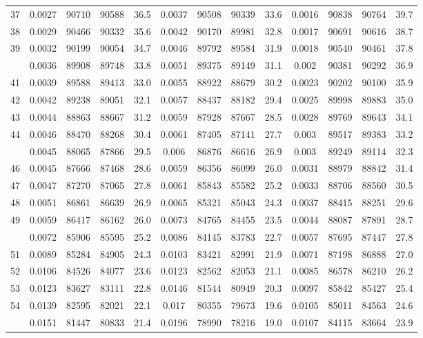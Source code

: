 \documentclass[
  14pt,
]{article}
\begin{document}
\begin{longtable}[t]{lcccccccccccc}
37 & 0.0027 & 90710 & 90588 & 36.5 & 0.0037 & 90508 & 90339 & 33.6 & 0.0016 & 90838 & 90764 & 39.7\\
38 & 0.0029 & 90466 & 90332 & 35.6 & 0.0042 & 90170 & 89981 & 32.8 & 0.0017 & 90691 & 90616 & 38.7\\
39 & 0.0032 & 90199 & 90054 & 34.7 & 0.0046 & 89792 & 89584 & 31.9 & 0.0018 & 90540 & 90461 & 37.8\\
\addlinespace
40 & 0.0036 & 89908 & 89748 & 33.8 & 0.0051 & 89375 & 89149 & 31.1 & 0.002 & 90381 & 90292 & 36.9\\
41 & 0.0039 & 89588 & 89413 & 33.0 & 0.0055 & 88922 & 88679 & 30.2 & 0.0023 & 90202 & 90100 & 35.9\\
42 & 0.0042 & 89238 & 89051 & 32.1 & 0.0057 & 88437 & 88182 & 29.4 & 0.0025 & 89998 & 89883 & 35.0\\
43 & 0.0044 & 88863 & 88667 & 31.2 & 0.0059 & 87928 & 87667 & 28.5 & 0.0028 & 89769 & 89643 & 34.1\\
44 & 0.0046 & 88470 & 88268 & 30.4 & 0.0061 & 87405 & 87141 & 27.7 & 0.003 & 89517 & 89383 & 33.2\\
\addlinespace
45 & 0.0045 & 88065 & 87866 & 29.5 & 0.006 & 86876 & 86616 & 26.9 & 0.003 & 89249 & 89114 & 32.3\\
46 & 0.0045 & 87666 & 87468 & 28.6 & 0.0059 & 86356 & 86099 & 26.0 & 0.0031 & 88979 & 88842 & 31.4\\
47 & 0.0047 & 87270 & 87065 & 27.8 & 0.0061 & 85843 & 85582 & 25.2 & 0.0033 & 88706 & 88560 & 30.5\\
48 & 0.0051 & 86861 & 86639 & 26.9 & 0.0065 & 85321 & 85043 & 24.3 & 0.0037 & 88415 & 88251 & 29.6\\
49 & 0.0059 & 86417 & 86162 & 26.0 & 0.0073 & 84765 & 84455 & 23.5 & 0.0044 & 88087 & 87891 & 28.7\\
\addlinespace
50 & 0.0072 & 85906 & 85595 & 25.2 & 0.0086 & 84145 & 83783 & 22.7 & 0.0057 & 87695 & 87447 & 27.8\\
51 & 0.0089 & 85284 & 84905 & 24.3 & 0.0103 & 83421 & 82991 & 21.9 & 0.0071 & 87198 & 86888 & 27.0\\
52 & 0.0106 & 84526 & 84077 & 23.6 & 0.0123 & 82562 & 82053 & 21.1 & 0.0085 & 86578 & 86210 & 26.2\\
53 & 0.0123 & 83627 & 83111 & 22.8 & 0.0146 & 81544 & 80949 & 20.3 & 0.0097 & 85842 & 85427 & 25.4\\
54 & 0.0139 & 82595 & 82021 & 22.1 & 0.017 & 80355 & 79673 & 19.6 & 0.0105 & 85011 & 84563 & 24.6\\
\addlinespace
55 & 0.0151 & 81447 & 80833 & 21.4 & 0.0196 & 78990 & 78216 & 19.0 & 0.0107 & 84115 & 83664 & 23.9\\

\end{longtable}
\end{document}
